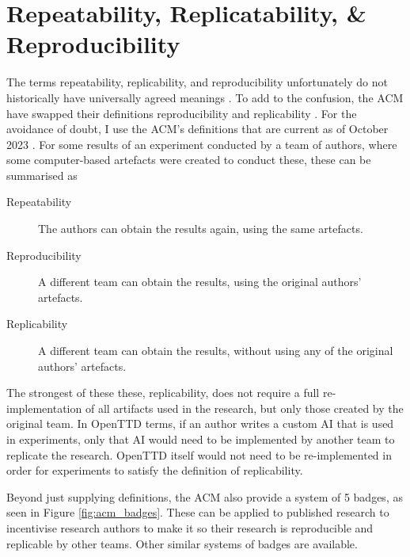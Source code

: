 \documentclass[logo,msc]{infthesis}           %
\begin{document}
\section{Repeatability, Replicatability, \& Reproducibility}



The terms repeatability, replicability, and reproducibility unfortunately do not historically have universally agreed meanings \cite{plesser_reproducibility_2018}. To add to the confusion, the ACM have swapped their definitions reproducibility and replicability \cite{association_for_computing_machiner_new_2020}. For the avoidance of doubt, I use the ACM's definitions that are current as of October 2023 \cite{association_for_computing_machiner_artifact_2020}. For some results of an experiment conducted by a team of authors, where some computer-based artefacts were created to conduct these, these can be summarised as

\begin{description}
\item[Repeatability] The authors can obtain the results again, using the same artefacts.
\item[Reproducibility] A different team can obtain the results, using the original authors' artefacts.
\item[Replicability] A different team can obtain the results, without using any of the original authors' artefacts.
\end{description}

The strongest of these these, replicability, does not require a full re-implementation of all artifacts used in the research, but only those created by the original team. In OpenTTD terms, if an author writes a custom AI that is used in experiments, only that AI would need to be implemented by another team to replicate the research. OpenTTD itself would not need to be re-implemented in order for experiments to satisfy the definition of replicability.

Beyond just supplying definitions, the ACM also provide a system of 5 badges, as seen in Figure \ref{fig:acm_badges}. These can be applied to published research to incentivise research authors to make it so their research is reproducible and replicable by other teams. Other similar systems of badges are available.
\end{document}
